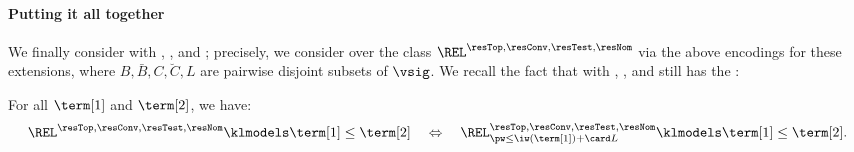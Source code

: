 \paragraph*{Putting it all together}
We finally consider  with , , and ;
precisely, we consider  over the class
$\REL^{\resTop, \resConv, \resTest, \resNom}$ via the above encodings for these extensions,
where $B, \bar{B}, C, \breve{C}, L$ are pairwise disjoint subsets of $\vsig$.
We recall the fact that 
 with , , and 
still has the :
\begin{proposition}\label{proposition: ext bounded pw property}
    For all  $\term[1]$ and $\term[2]$,
    we have:
    \[\REL^{\resTop, \resConv, \resTest, \resNom} \klmodels \term[1] \le \term[2] \quad\Leftrightarrow\quad
    \REL^{\resTop, \resConv, \resTest, \resNom}_{\pw \le \iw(\term[1]) + \card L} \klmodels \term[1] \le \term[2].\]
\end{proposition}

